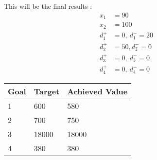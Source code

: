 \documentclass{article}
\begin{document}
This will be the final results :
\begin{align*}
x_1 &= 90 \\
x_2 &= 100 \\
d_1^{+} &= 0, \ d_1^{-} = 20 \\
d_2^{+} &= 50, d_2^{-} = 0 \\
d_3^{+} &= 0, \ d_3^{-} = 0 \\
d_4^{+} &= 0, \ d_4^{-} = 0 
\end{align*}


\begin{table}[]
\begin{tabular}{|l|l|l|}
\hline
Goal & Target & Achieved Value \\ \hline
1    & 600    & 580            \\ \hline
2    & 700    & 750            \\ \hline
3    & 18000  & 18000          \\ \hline
4    & 380    & 380            \\ \hline
\end{tabular}
\end{table}
 
\end{document}
